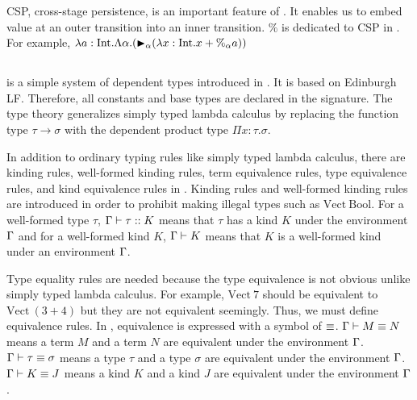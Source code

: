 
CSP, cross-stage persistence, is an important feature of \LTP.
It enables us to embed value at an outer transition into an inner transition.
$\%$ is dedicated to CSP in \LTP.
For example, $\lambda a:\textrm{Int}.\Lambda\alpha.({\mathop{\blacktriangleright}}_\alpha (\lambda x:\textrm{Int}.x+\%_\alpha a))$



\subsection{\LLF}

\LLF is a simple system of dependent types introduced in \cite{attapl}.
It is based on Edinburgh LF\cite{harper1993framework}.
Therefore, all constants and base types are declared in the signature.
The \LLF type theory generalizes simply typed lambda calculus
by replacing the function type $\tau\to\sigma$ with the dependent product type $\Pi x:\tau.\sigma$.

In addition to ordinary typing rules like simply typed lambda calculus,
there are kinding rules, well-formed kinding rules, term equivalence rules, type equivalence rules, and kind equivalence rules in \LLF.
Kinding rules and well-formed kinding rules are 
introduced in order to prohibit making illegal types such as $\textrm{Vect}\ \textrm{Bool}$.
For a well-formed type $\tau$, $\Gamma \vdash \tau :: K$ means that $\tau$ has a kind $K$ under the environment $\Gamma$ and 
for a well-formed kind $K$, $\Gamma \vdash K$ means that $K$ is a well-formed kind under an environment $\Gamma$.

Type equality rules are needed because the type equivalence is not obvious unlike simply typed lambda calculus.
For example, $\textrm{Vect}\ 7$ should be equivalent to $\textrm{Vect}\ (3+4)$
but they are not equivalent seemingly. Thus, we must define equivalence rules.
In \LLF, equivalence is expressed with a symbol of $\equiv$.
$\Gamma \vdash M \equiv N$ means a term $M$ and a term $N$ are equivalent under the environment $\Gamma$.
$\Gamma \vdash \tau \equiv \sigma$ means a type $\tau$ and a type $\sigma$ are equivalent under the environment $\Gamma$.
$\Gamma \vdash K \equiv J$ means a kind $K$ and a kind $J$ are equivalent under the environment $\Gamma$.

